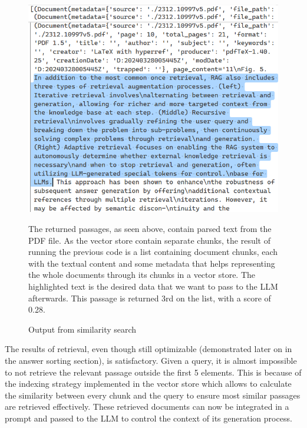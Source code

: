 \begin{figure}[H]
    \centering
    \includegraphics[width=\linewidth]{./figures/vectorstoresimilaritysearchwithscore_output.png}
    \caption{Output from similarity search}
    \begin{flushleft}
        \small The returned passages, as seen above, contain parsed text from the PDF file. As the vector store contain separate chunks, the result of running the previous code is a list containing document chunks, each with the textual content and some metadata that helps representing the whole documents through its chunks in a vector store. The highlighted text is the desired data that we want to pass to the LLM afterwards. This passage is returned 3rd on the list, with a score of 0.28.
    \end{flushleft}
\end{figure}
The results of retrieval, even though still optimizable (demonstrated later on in the answer sorting section), is satisfactory. Given a query, it is almost impossible to not retrieve the relevant passage outside the first 5 elements. This is because of the indexing strategy implemented in the vector store which allows to calculate the similarity between every chunk and the query to ensure most similar passages are retrieved effectively.\newline
These retrieved documents can now be integrated in a prompt and passed to the LLM to control the context of its generation process.
